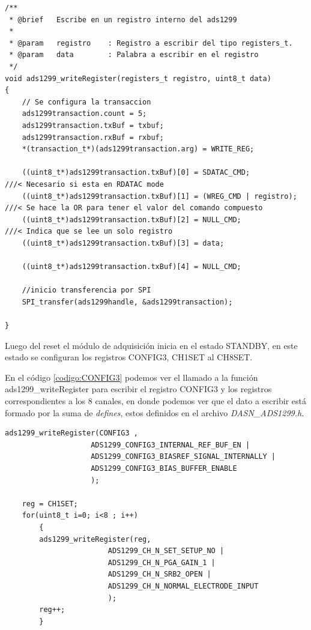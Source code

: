 \begin{lstlisting}[caption= Función para escribir un registro del ADS1299. , firstnumber=524 , label=codigo:WriteReg]
/**
 * @brief   Escribe en un registro interno del ads1299
 *
 * @param   registro    : Registro a escribir del tipo registers_t.
 * @param   data        : Palabra a escribir en el registro
 */
void ads1299_writeRegister(registers_t registro, uint8_t data)
{
    // Se configura la transaccion
    ads1299transaction.count = 5;
    ads1299transaction.txBuf = txbuf;
    ads1299transaction.rxBuf = rxbuf;
    *(transaction_t*)(ads1299transaction.arg) = WRITE_REG;

    ((uint8_t*)ads1299transaction.txBuf)[0] = SDATAC_CMD;              ///< Necesario si esta en RDATAC mode
    ((uint8_t*)ads1299transaction.txBuf)[1] = (WREG_CMD | registro);   ///< Se hace la OR para tener el valor del comando compuesto
    ((uint8_t*)ads1299transaction.txBuf)[2] = NULL_CMD;                ///< Indica que se lee un solo registro
    ((uint8_t*)ads1299transaction.txBuf)[3] = data;

    ((uint8_t*)ads1299transaction.txBuf)[4] = NULL_CMD;

    //inicio transferencia por SPI
    SPI_transfer(ads1299handle, &ads1299transaction);

}
\end{lstlisting}

Luego del reset el módulo de adquisición inicia en el estado STANDBY, en este estado se configuran los registros CONFIG3, CH1SET al CH8SET.

En el código \ref{codigo:CONFIG3} podemos ver el llamado a la función ads1299\_writeRegister para escribir el registro CONFIG3 y los registros correspondientes a los 8 canales, en donde podemos ver que el dato a escribir está formado por la suma de \textit{defines}, estos definidos en el archivo \textit{DASN\_ADS1299.h}.

\begin{lstlisting}[caption= Configuración de CONFIG3. , firstnumber=198 , label=codigo:CONFIG3]
	ads1299_writeRegister(CONFIG3 ,
					ADS1299_CONFIG3_INTERNAL_REF_BUF_EN |
					ADS1299_CONFIG3_BIASREF_SIGNAL_INTERNALLY |
					ADS1299_CONFIG3_BIAS_BUFFER_ENABLE
					);
	
	reg = CH1SET;
	for(uint8_t i=0; i<8 ; i++)
		{
		ads1299_writeRegister(reg,
						ADS1299_CH_N_SET_SETUP_NO |
						ADS1299_CH_N_PGA_GAIN_1 |
						ADS1299_CH_N_SRB2_OPEN |
						ADS1299_CH_N_NORMAL_ELECTRODE_INPUT
	                    );
		reg++;
		}
\end{lstlisting}

